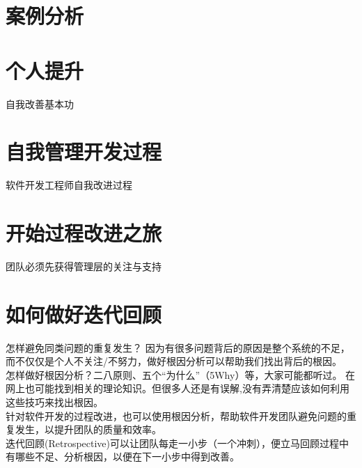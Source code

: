 \documentclass{book}        %
\begin{document}
\part{案例分析}




\part{个人提升}自我改善基本功 \\




\part{自我管理开发过程}软件开发工程师自我改进过程\\









\part{开始过程改进之旅}团队必须先获得管理层的关注与支持\\





\part{如何做好迭代回顾}怎样避免同类问题的重复发生？ 因为有很多问题背后的原因是整个系统的不足， 而不仅仅是个人不关注/不努力，做好根因分析可以帮助我们找出背后的根因。\\

怎样做好根因分析？二八原则、五个“为什么”（5Why）等，大家可能都听过。 在网上也可能找到相关的理论知识。但很多人还是有误解,没有弄清楚应该如何利用这些技巧来找出根因。\\

针对软件开发的过程改进，也可以使用根因分析，帮助软件开发团队避免问题的重复发生，以提升团队的质量和效率。\\

迭代回顾(Retrospective)可以让团队每走一小步（一个冲刺），便立马回顾过程中有哪些不足、分析根因，以便在下一小步中得到改善。\\
\end{document}
